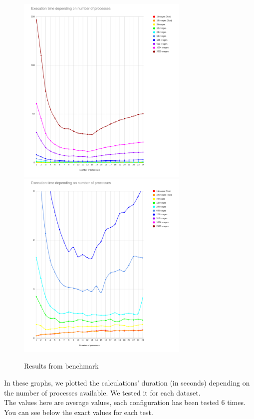 \begin{figure}[H]
    \centering
    \includegraphics[width=8.2cm]{images/perfsAverage.png}
    \includegraphics[width=8.2cm]{images/perfsAverageZoomed.png}
    \caption{Results from benchmark}
    \label{fig:benchmarkResAverage}
\end{figure}
In these graphs, we plotted the calculations' duration (in seconds) depending on the number of processes available. We tested it for each dataset.\\
The values here are average values, each configuration has been tested 6 times.\\
You can see below the exact values for each test.

